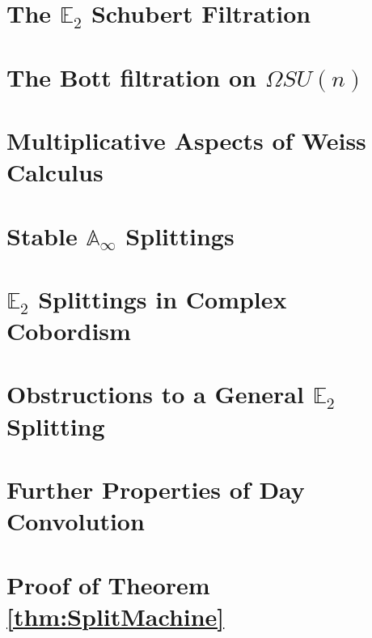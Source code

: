 \documentclass[reqno, oneside]{amsart}
\theoremstyle{definition}
\theoremstyle{plain}
\begin{document}


\section{The $\mathbb{E}_2$ Schubert Filtration}



\section{The Bott filtration on \texorpdfstring{$\Omega SU(n)$}{OmegaSU(n)}} \label{sec:MRFil}

 

\section{Multiplicative Aspects of Weiss Calculus} \label{sec:MultWeiss}



\section{Stable \texorpdfstring{$\mathbb{A}_\infty$}{Aoo} Splittings} \label{sec:AooSplit}



\section{\texorpdfstring{$\mathbb{E}_2$}{E2} Splittings in Complex Cobordism} \label{sec:MUE2}



\section{Obstructions to a General \texorpdfstring{$\mathbb{E}_2$}{E2} Splitting} \label{sec:Obstruction}



\appendix

\section{Further Properties of Day Convolution}\label{app:day}



\section{Proof of Theorem \ref{thm:SplitMachine}}\label{app:SplittingMachine}
\end{document}
